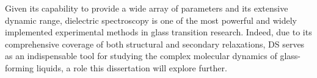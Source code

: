Given its capability to provide a wide array of parameters and its extensive dynamic range, dielectric spectroscopy is one of the most powerful and widely implemented experimental methods in glass transition research. Indeed, due to its comprehensive coverage of both structural and secondary relaxations, DS serves as an indispensable tool for studying the complex molecular dynamics of glass-forming liquids, a role this dissertation will explore further.
